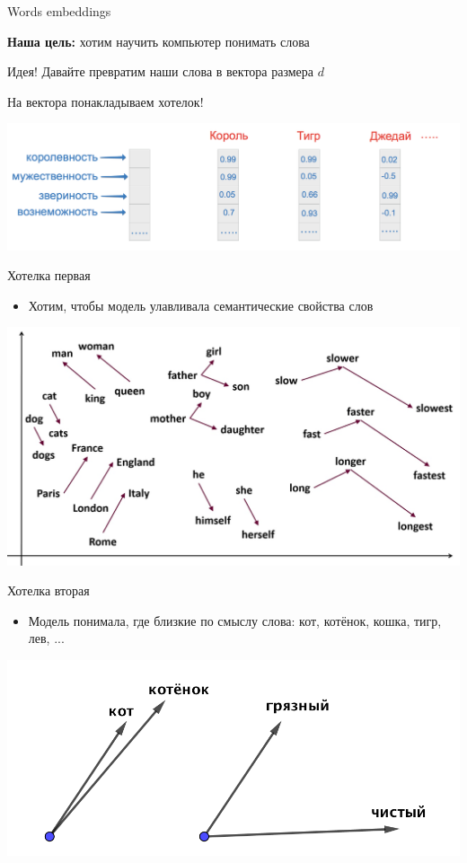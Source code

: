 \documentclass[notes,12pt, aspectratio=169]{beamer}
\newenvironment{wideitemize}{\itemize\addtolength{\itemsep}{10pt}}{\enditemize}
\begin{document}
\begin{frame}{Words embeddings}
\begin{wideitemize} 
	\item \textbf{Наша цель:}  хотим научить компьютер понимать слова
	\item Идея! Давайте превратим наши слова в вектора размера $d$
	\item На вектора понакладываем хотелок! 
\end{wideitemize} 
\begin{center}
	\includegraphics[width=.95\linewidth]{vectors.png}
\end{center}
\end{frame} 


\begin{frame}{Хотелка первая}
\begin{itemize} 
\item Хотим, чтобы модель улавливала семантические свойства слов
\end{itemize} 


\begin{center}
\includegraphics[width=.8\linewidth]{w2v_sim.jpg}
\end{center}
\end{frame} 


\begin{frame}{Хотелка вторая}
\begin{itemize} 
\item Модель понимала, где близкие по смыслу слова: кот, котёнок, кошка, тигр, лев, ...	
\end{itemize} 


\begin{center}
\includegraphics[width=.7\linewidth]{w2v_dist.png}
\end{center}
\end{frame} 
\end{document}
